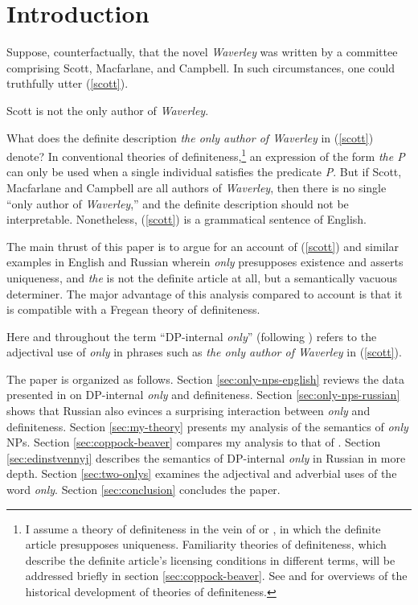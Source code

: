 \section{Introduction \label{sec:intro}}
Suppose, counterfactually, that the novel \textit{Waverley} was written by a committee comprising Scott, Macfarlane, and Campbell. In such circumstances, one could truthfully utter (\ref{scott}).

\begin{exe}
	\ex \label{scott} Scott is not the only author of \textit{Waverley}.\\
	\hspace*{\fill} \citep{cb2015}  %
\end{exe}

What does the definite description \textit{the only author of Waverley} in (\ref{scott}) denote? In conventional theories of definiteness,\footnote{I assume a theory of definiteness in the vein of \citet{frege} or \citet{strawson50}, in which the definite article presupposes uniqueness. Familiarity theories of definiteness, which describe the definite article's licensing conditions in different terms, will be addressed briefly in section \ref{sec:coppock-beaver}. See \citet[chap. 1]{schwarz09} and \citet{horn-abbott-2012} for overviews of the historical development of theories of definiteness.} an expression of the form \textit{the P} can only be used when a single individual satisfies the predicate \textit{P}. But if Scott, Macfarlane and Campbell are all authors of \textit{Waverley}, then there is no single ``only author of \textit{Waverley},'' and the definite description should not be interpretable. Nonetheless, (\ref{scott}) is a grammatical sentence of English.

The main thrust of this paper is to argue for an account of (\ref{scott}) and similar examples in English and Russian wherein \textit{only} presupposes existence and asserts uniqueness, and \textit{the} is not the definite article at all, but a semantically vacuous determiner. The major advantage of this analysis compared to  account is that it is compatible with a Fregean theory of definiteness.

Here and throughout the term ``DP-internal \textit{only}'' (following \citet{mcnally08}) refers to the adjectival use of \textit{only} in phrases such as \textit{the only author of Waverley} in (\ref{scott}).

The paper is organized as follows. Section \ref{sec:only-nps-english} reviews the data presented in \citet{cb2015} on DP-internal \textit{only} and definiteness. Section \ref{sec:only-nps-russian} shows that Russian also evinces a surprising interaction between \textit{only} and definiteness. Section \ref{sec:my-theory} presents my analysis of the semantics of \textit{only} NPs. Section \ref{sec:coppock-beaver} compares my analysis to that of \citet{cb2015}. Section \ref{sec:edinstvennyj} describes the semantics of DP-internal \textit{only} in Russian in more depth. Section \ref{sec:two-onlys} examines the adjectival and adverbial uses of the word \textit{only}. Section \ref{sec:conclusion} concludes the paper.